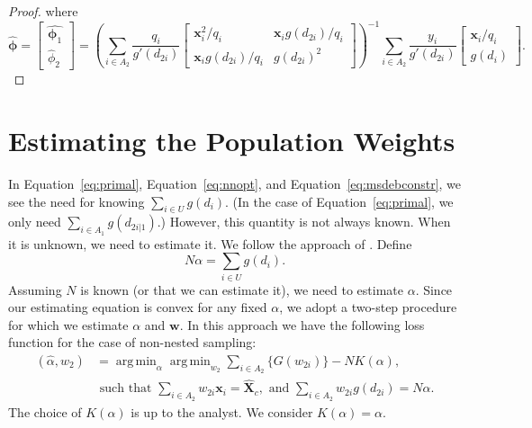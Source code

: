\documentclass[12pt]{article}
\DeclareMathOperator*{\argmin}{arg\,min}
\renewcommand{\bf}[1]{\mathbf{#1}}
\begin{document}
\begin{proof}
  where 
  $$\hat{\bm \phi} =
  \begin{bmatrix}
    \hat{\bm \phi_1} \\ \hat \phi_2
  \end{bmatrix} = 
  \left(\sum_{i \in A_2} \frac{q_i}{g'(d_{2i})} 
  \begin{bmatrix}
    \bf x_i^2 / q_i & \bf x_i g(d_{2i}) / q_i \\
    \bf x_i g(d_{2i}) / q_i & g(d_{2i})^2
  \end{bmatrix}
  \right)^{-1}
  \sum_{i \in A_2} \frac{y_i}{g'(d_{2i})} 
  \begin{bmatrix} \bf x_i / q_i \\ g(d_i) \end{bmatrix}.
  $$

\end{proof}

\section{Estimating the Population Weights}

In Equation~\ref{eq:primal}, Equation~\ref{eq:nnopt}, and
Equation~\ref{eq:msdebconstr}, we see the need for knowing $\sum_{i \in U}
g(d_i)$. (In the case of Equation~\ref{eq:primal}, we only need $\sum_{i \in
A_1} g(d_{2i|1})$.) However, this quantity is not always known. When it is
unknown, we need to estimate it.
We follow the approach of \cite{kwon2024debiased}. Define 
$$N \alpha = \sum_{i \in U} g(d_i).$$
Assuming $N$ is known (or that we can estimate it), we need to estimate
$\alpha$. Since our estimating equation is convex for any fixed $\alpha$, we
adopt a two-step procedure for which we estimate $\alpha$ and $\bf w$. In this
approach we have the following loss function for the case of non-nested sampling:
\begin{align*}
  (\hat \alpha, \hat w_2) 
  &= 
  \argmin_{\alpha} \argmin_{w_2} \sum_{i \in A_2} \{G(w_{2i})\} - NK(\alpha), \\
  &\text{ such that } \sum_{i \in A_2} w_{2i} \bf x_i = \hat{\bf X}_c,
  \text{ and } \sum_{i \in A_2} w_{2i} g(d_{2i}) = N\alpha.
\end{align*}
The choice of $K(\alpha)$ is up to the analyst. We consider $K(\alpha) =
\alpha$.
\end{document}
